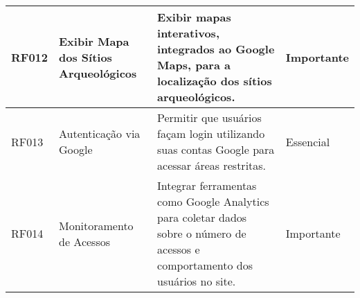 {\begin{longtable}{|>{\raggedright}p{2.5cm}|>{\raggedright}p{4cm}|p{6cm}|>{\raggedright}p{2cm}|}
\hline
RF012 & Exibir Mapa dos Sítios Arqueológicos & Exibir mapas interativos, integrados ao Google Maps, para a localização dos sítios arqueológicos. & Importante \\
\hline
RF013 & Autenticação via Google & Permitir que usuários façam login utilizando suas contas Google para acessar áreas restritas. & Essencial \\
\hline
RF014 & Monitoramento de Acessos & Integrar ferramentas como Google Analytics para coletar dados sobre o número de acessos e comportamento dos usuários no site. & Importante \\
\hline
\end{longtable}
} %
